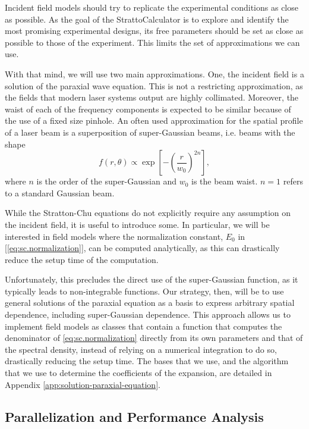\documentclass[11pt,SymmetricalJury]{inrsthesis/inrsthesis}
\begin{document}
Incident field models should try to replicate the experimental conditions
as close as possible. As the goal of the StrattoCalculator is to explore
and identify the most promising experimental designs, its free parameters
should be set as close as possible to those of the experiment. This limits
the set of approximations we can use.

With that mind, we will use two main approximations. One, the incident field
is a solution of the paraxial wave equation. This is not a restricting approximation,
as the fields that modern laser systems output are highly collimated. Moreover,
the waist of each of the frequency components is expected to be similar because
of the use of a fixed size pinhole.
An often used approximation for the spatial profile of a laser beam is a
superposition of super-Gaussian beams, i.e. beams with the shape
  \begin{equation}
    f(r,\theta) \propto \exp\left[-\left(\frac{r}{w_0}\right)^{2n}\right],
  \end{equation}
where $n$ is the order of the super-Gaussian and $w_0$ is the beam waist.
$n=1$ refers to a standard Gaussian beam.

While the Stratton-Chu equations do not explicitly require any assumption on
the incident field, it is useful to introduce some. In particular, we will be
interested in field models where the normalization constant, $E_0$ in [\eqref{eq:sc.normalization}],
can be computed analytically, as this can drastically reduce the setup time
of the computation. 

Unfortunately, this precludes the direct use of the super-Gaussian function,
as it typically leads to non-integrable functions. Our strategy, then, will
be to use general solutions of the paraxial equation as a basis to express
arbitrary spatial dependence, including super-Gaussian dependence.
This approach allows us to implement field models as classes that contain
a function that computes the denominator of \eqref{eq:sc.normalization}
directly from its own parameters and that of the spectral density, instead
of relying on a numerical integration to do so, drastically reducing the
setup time. The bases that we use, and the algorithm that we use to determine
the coefficients of the expansion, are detailed in Appendix \ref{app:solution-paraxial-equation}.

\subsection{Parallelization and Performance Analysis}
\end{document}
